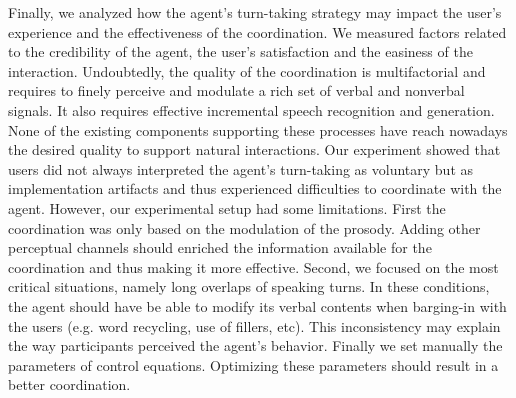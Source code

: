Finally, we analyzed how the agent's turn-taking strategy may impact the user's experience and the effectiveness of the coordination.
We measured factors related to the credibility of the agent,
the user's satisfaction and the easiness of the interaction.  
Undoubtedly, the quality of the coordination is multifactorial and requires to finely perceive and modulate a rich set of verbal and nonverbal signals. It also requires effective incremental speech recognition and generation. None of the existing components supporting these processes have reach nowadays the desired quality to support natural interactions. Our experiment showed that users did not always interpreted the agent's turn-taking as voluntary but as implementation artifacts and thus experienced difficulties to coordinate with the agent. 
However, our experimental setup had some limitations. 
First the coordination was only based on the modulation of the prosody. Adding other perceptual channels should enriched the information available for the coordination and thus making it more effective.
Second, we focused on the most critical situations, namely long overlaps of speaking turns. In these conditions, the agent should have be able to modify its verbal contents when barging-in with the users (e.g. word recycling, use of fillers, etc). This inconsistency may explain the way participants perceived the agent's behavior. 
Finally we set manually the parameters of control equations. Optimizing these parameters should result in a better coordination. 

